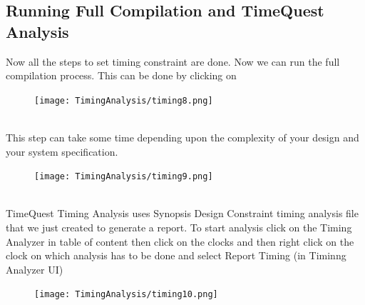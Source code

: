 \documentclass[12pt,singleside,a4paper]{article}
\begin{document}
\subsection{Running Full Compilation and TimeQuest Analysis}

Now all the steps to set timing constraint are done. Now we can run the full compilation process. This can be done by clicking on
        \begin{figure}[H]
            \centering
            \texttt{[image: TimingAnalysis/timing8.png]}
        \end{figure}\\
        
        This step can take some time depending upon the complexity of your design and your system specification.
        \begin{figure}[H]
            \centering
            \texttt{[image: TimingAnalysis/timing9.png]}
        \end{figure}\\
        
TimeQuest Timing Analysis uses Synopsis Design Constraint timing analysis file that we just created to generate a report.
To start analysis click on the Timing Analyzer in table of content then click on the clocks and then right click on the clock on which analysis has to be done and select Report Timing (in Timinng Analyzer UI)    
        \begin{figure}[H]
            \centering
            \texttt{[image: TimingAnalysis/timing10.png]}
        \end{figure}\\
\end{document}
